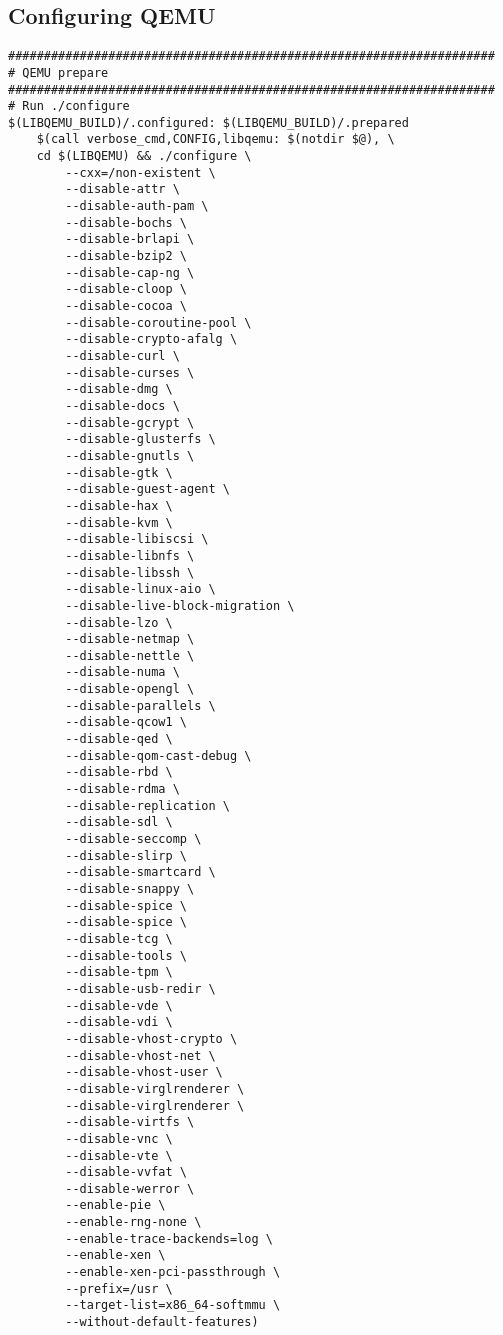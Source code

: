 \subsection{Configuring QEMU}
\label{subsec:configuring-qemu}

\begin{lstlisting}
####################################################################
# QEMU prepare
####################################################################
# Run ./configure
$(LIBQEMU_BUILD)/.configured: $(LIBQEMU_BUILD)/.prepared
	$(call verbose_cmd,CONFIG,libqemu: $(notdir $@), \
	cd $(LIBQEMU) && ./configure \
        --cxx=/non-existent \
        --disable-attr \
        --disable-auth-pam \
        --disable-bochs \
        --disable-brlapi \
        --disable-bzip2 \
        --disable-cap-ng \
        --disable-cloop \
        --disable-cocoa \
        --disable-coroutine-pool \
        --disable-crypto-afalg \
        --disable-curl \
        --disable-curses \
        --disable-dmg \
        --disable-docs \
        --disable-gcrypt \
        --disable-glusterfs \
        --disable-gnutls \
        --disable-gtk \
        --disable-guest-agent \
        --disable-hax \
        --disable-kvm \
        --disable-libiscsi \
        --disable-libnfs \
        --disable-libssh \
        --disable-linux-aio \
        --disable-live-block-migration \
        --disable-lzo \
        --disable-netmap \
        --disable-nettle \
        --disable-numa \
        --disable-opengl \
        --disable-parallels \
        --disable-qcow1 \
        --disable-qed \
        --disable-qom-cast-debug \
        --disable-rbd \
        --disable-rdma \
        --disable-replication \
        --disable-sdl \
        --disable-seccomp \
        --disable-slirp \
        --disable-smartcard \
        --disable-snappy \
        --disable-spice \
        --disable-spice \
        --disable-tcg \
        --disable-tools \
        --disable-tpm \
        --disable-usb-redir \
        --disable-vde \
        --disable-vdi \
        --disable-vhost-crypto \
        --disable-vhost-net \
        --disable-vhost-user \
        --disable-virglrenderer \
        --disable-virglrenderer \
        --disable-virtfs \
        --disable-vnc \
        --disable-vte \
        --disable-vvfat \
        --disable-werror \
        --enable-pie \
        --enable-rng-none \
        --enable-trace-backends=log \
        --enable-xen \
        --enable-xen-pci-passthrough \
        --prefix=/usr \
        --target-list=x86_64-softmmu \
        --without-default-features)
\end{lstlisting}


